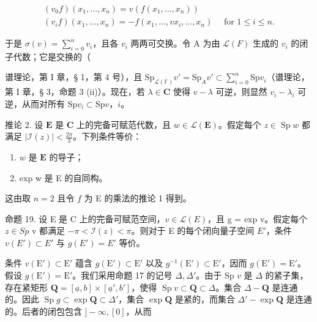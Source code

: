 \[
\begin{array}{l} (v _ {0} f) (x _ {1}, \dots , x _ {n}) = v (f (x _ {1}, \dots , x _ {n})) \\ (v _ {i} f) (x _ {1}, \dots , x _ {n}) = - f (x _ {1}, \dots , v x _ {i}, \dots , x _ {n}) \quad \text { for } 1 \leqslant i \leqslant n. \end{array}
\]

于是 \(\sigma(v) = \sum_{i=0}^{n} v_i\)，且各 \(v_i\) 两两可交换。令 A 为由 \(\mathcal{L}(F)\) 生成的 \(v_i\) 的闭子代数；它是交换的（

谱理论，第 I 章，§ 1，第 4 号），且 \(\mathrm{Sp}_{\mathcal{L}(\mathbb{F})}v' = \mathrm{Sp}_A v' \subset \sum_{i=0}^{n} \mathrm{Sp} v_i\)（谱理论，第 I 章，§ 3，命题 3 (ii)）。现在，若 \(\lambda \in \mathbf{C}\) 使得 \(v - \lambda\) 可逆，则显然 \(v_i - \lambda_i\) 可逆，从而对所有 \(\mathrm{Sp} v_i \subset \mathrm{Sp} v\)，\(i\)。

推论 2. 设 \(\mathbf{E}\) 是 \(\mathbf{C}\) 上的完备可赋范代数，且 \(w \in \mathcal{L}(\mathbf{E})\)。假定每个 \(z \in \operatorname{Sp} w\) 都满足 \(|\mathcal{I}(z)| < \frac{2\pi}{3}\)。下列条件等价：

\begin{enumerate}
\def\labelenumi{(\roman{enumi})}
\item
  \(w\) 是 \(\mathbf{E}\) 的导子；
\item
  exp w 是 E 的自同构。
\end{enumerate}

这由取 \(n = 2\) 且令 \(f\) 为 E 的乘法的推论 1 得到。

命题 19. 设 E 是 C 上的完备可赋范空间，\(v \in \mathcal{L}(E)\)，且 g = exp v。假定每个 \(z \in Sp\) v 都满足 \(-\pi < \mathcal{I}(z) < \pi\)。则对于 E 的每个闭向量子空间 \(E'\)，条件 \(v(E') \subset E'\) 与 \(g(E') = E'\) 等价。

条件 \(v(\mathrm{E}') \subset \mathrm{E}'\) 蕴含 \(g(\mathrm{E}') \subset \mathrm{E}'\) 以及 \(g^{-1}(\mathrm{E}') \subset \mathrm{E}'\)，因而 \(g(\mathrm{E}') = \mathrm{E}'\)。假设 \(g(\mathrm{E}') = \mathrm{E}'\)。我们采用命题 17 的记号 \(\Delta, \Delta'\)。由于 Sp \(v\) 是 \(\Delta\) 的紧子集，存在紧矩形 \(\mathbf{Q} = [\underline{a}, b] \times [\underline{a}', b']\)，使得 \(\operatorname{Sp} v \subset \mathbf{Q} \subset \Delta\)。集合 \(\Delta - \mathbf{Q}\) 是连通的。因此 \(\operatorname{Sp} g \subset \exp \mathbf{Q} \subset \Delta'\)，集合 \(\exp \mathbf{Q}\) 是紧的，而集合 \(\Delta' - \exp \mathbf{Q}\) 是连通的。后者的闭包包含 \(] - \infty, [0]\)，从而

